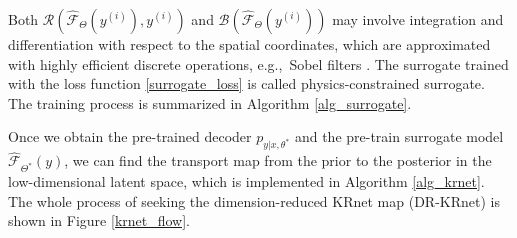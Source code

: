 Both $\mathcal{R}\left(\hat{\mathcal{F}}_{\Theta}\left(y^{(i)}\right),y^{(i)}\right)$ and $\mathcal{B}\left(\hat{\mathcal{F}}_{\Theta}\left(y^{(i)}\right)\right)$ may involve
integration and differentiation with respect to the spatial coordinates, which are approximated with highly efficient discrete operations, e.g.,\ Sobel filters \cite{ma2004invitation,zhu2019physics}. The surrogate trained with the loss function  \eqref{surrogate_loss} is called
physics-constrained surrogate. The %
training process is summarized in Algorithm \ref{alg_surrogate}.

Once we obtain the pre-trained decoder $p_{y|x,\theta^*}$ and the pre-train surrogate model $\hat{\mathcal{F}}_{\Theta^*}(y)$, we can find the transport map from the prior to the posterior in the low-dimensional latent space, 
which is implemented in Algorithm \ref{alg_krnet}. The whole process of seeking the dimension-reduced KRnet map (DR-KRnet) is shown in Figure \ref{krnet_flow}.

